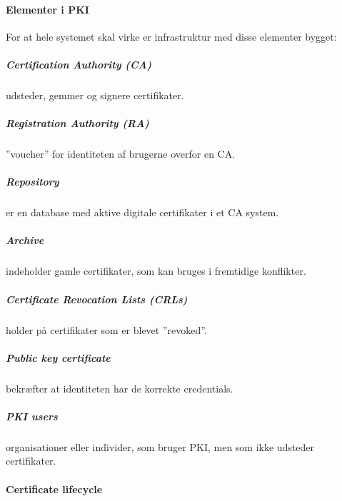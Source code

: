 \paragraph{Elementer i PKI}
For at hele systemet skal virke er infrastruktur med disse elementer bygget: 

\subparagraph{Certification Authority (CA)} udsteder, gemmer og signere certifikater.

\subparagraph{Registration Authority (RA)} ''voucher'' for identiteten af brugerne overfor en CA.

\subparagraph{Repository} er en database med aktive digitale certifikater i et CA system.

\subparagraph{Archive} indeholder gamle certifikater, som kan bruges i fremtidige konflikter.

\subparagraph{Certificate Revocation Lists (CRLs)} holder på certifikater som er blevet ''revoked''.

\subparagraph{Public key certificate} bekræfter at identiteten har de korrekte credentials.

\subparagraph{PKI users} organisationer eller individer, som bruger PKI, men som ikke udsteder certifikater.

\paragraph{Certificate lifecycle}
